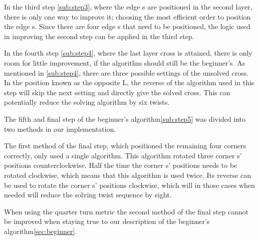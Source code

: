 In the third step \ref{sub:step3}, where the edge \cpiece{}s are positioned in the second layer, there is only one way to improve it; choosing the most efficient order to position the edge \cpiece{}s. Since there are four edge \cpiece{}s that need to be positioned, the logic used in improving the second step can be applied in the third step.

In the fourth step \ref{sub:step4}, where the last layer cross is attained, there is only room for little improvement, if the algorithm should still be the beginner's. As mentioned in \ref{sub:step4}, there are three possible settings of the unsolved cross. In the position known as the opposite L, the reverse of the algorithm used in this step will skip the next setting and directly give the solved cross. This can potentially reduce the solving algorithm by six twists.


The fifth and final step of the beginner's algorithm\ref{sub:step5} was divided into two methods in our implementation.


The first method of the final step, which positioned the remaining four corners correctly, only used a single algorithm. This algorithm rotated three corner \cpiece{}s' positions counterclockwise. Half the time the corner \cpiece{}s' positions needs to be rotated clockwise, which means that this algorithm is used twice. Its reverse can be used to rotate the corner \cpiece{}s' positions clockwise, which will in those cases when needed will reduce the solving twist sequence by eight.

When using the quarter turn metric the second method of the final step cannot be improved when staying true to our description of the beginner's algorithm\ref{sec:beginner}.